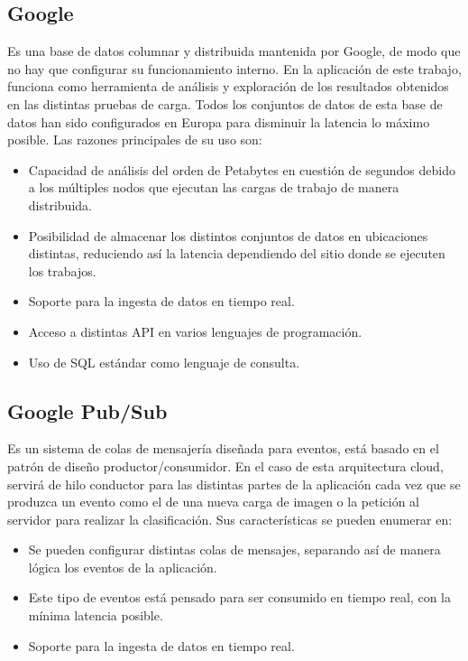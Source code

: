 \subsection{Google }\label{subsec:bigquery}
Es una base de datos columnar y distribuida mantenida por Google, de modo que no hay que configurar su funcionamiento interno.
En la aplicación de este trabajo,  funciona como herramienta de análisis y exploración de los resultados obtenidos en las distintas pruebas de carga.
Todos los conjuntos de datos de esta base de datos han sido configurados en Europa para disminuir la latencia lo máximo posible.
Las razones principales de su uso son:
\begin{itemize}
    \item Capacidad de análisis del orden de Petabytes en cuestión de segundos debido a los múltiples nodos que ejecutan las cargas de trabajo de manera distribuida.
    \item Posibilidad de almacenar los distintos conjuntos de datos en ubicaciones distintas, reduciendo así la latencia dependiendo del sitio donde se ejecuten los trabajos.
    \item Soporte para la ingesta de datos en tiempo real.
    \item Acceso a distintas API en varios lenguajes de programación.
    \item Uso de SQL estándar como lenguaje de consulta.
\end{itemize}

\subsection{Google Pub/Sub}\label{subsec:pubsub}
Es un sistema de colas de mensajería diseñada para eventos,
está basado en el patrón de diseño productor/consumidor.
En el caso de esta arquitectura cloud, servirá de hilo conductor para las distintas partes de la aplicación cada vez que se produzca un evento como el de una nueva carga de imagen o la petición al servidor para realizar la clasificación.
Sus características se pueden enumerar en:

\begin{itemize}
    \item Se pueden configurar distintas colas de mensajes, separando así de manera lógica los eventos de la aplicación.
    \item Este tipo de eventos está pensado para ser consumido en tiempo real, con la mínima latencia posible.
    \item Soporte para la ingesta de datos en tiempo real.
\end{itemize}

